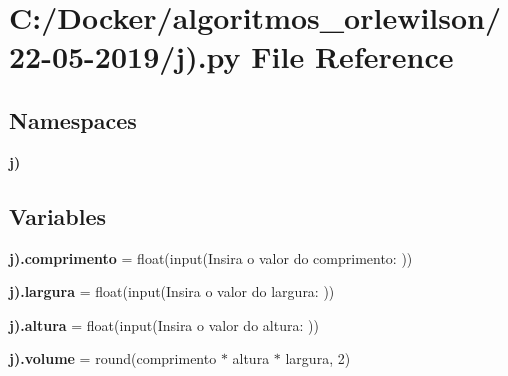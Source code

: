 \section{C\+:/\+Docker/algoritmos\+\_\+orlewilson/22-\/05-\/2019/j).py File Reference}
\label{j_08_8py}
\subsection*{Namespaces}
\begin{DoxyCompactItemize}
\item 
 \textbf{ j)}
\end{DoxyCompactItemize}
\subsection*{Variables}
\begin{DoxyCompactItemize}
\item 
\textbf{ j).\+comprimento} = float(input(\textquotesingle{}Insira o valor do comprimento\+: \textquotesingle{}))
\item 
\textbf{ j).\+largura} = float(input(\textquotesingle{}Insira o valor do largura\+: \textquotesingle{}))
\item 
\textbf{ j).\+altura} = float(input(\textquotesingle{}Insira o valor do altura\+: \textquotesingle{}))
\item 
\textbf{ j).\+volume} = round(comprimento $\ast$ altura $\ast$ largura, 2)
\end{DoxyCompactItemize}

